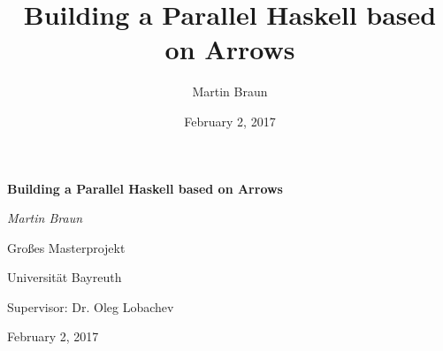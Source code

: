 \documentclass{beamer}
\title{Building a Parallel Haskell based on Arrows}
\author{Martin Braun}
\date{February 2, 2017}
\begin{document}
	\begin{frame}[fragile]
		\centering
		\vspace{0.75cm}
		{\huge\bfseries Building a Parallel Haskell based on Arrows\par}
		\vspace{0.5cm}
		{\Large\itshape Martin Braun\par}
		\vspace{0.5cm}
		\vfill
		Großes Masterprojekt\par
		Universität Bayreuth\par
		Supervisor:	Dr. Oleg Lobachev
		
		\vfill
		
		{\large February 2, 2017\par}
	\end{frame}
	\begin{frame}
		\tableofcontents
	\end{frame}
	
	
	
	
	
	
	
	
	\AtBeginSection{}
	
	\setcounter{tocdepth}{-1}
	
	
	\setcounter{tocdepth}{2}
\end{document}
